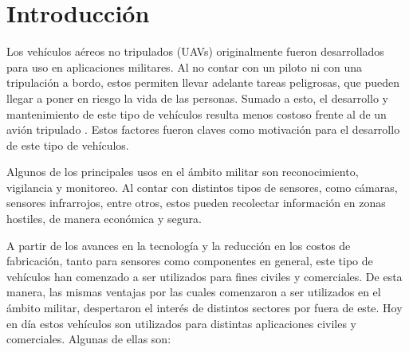 \section{Introducción}\label{sec:Introduccion}


Los vehículos aéreos no tripulados (UAVs) originalmente fueron desarrollados para uso en aplicaciones militares. Al no contar con un piloto ni con una tripulación a bordo, estos permiten llevar adelante tareas peligrosas, que pueden llegar a poner en riesgo la vida de las personas. Sumado a esto, el desarrollo y mantenimiento de este tipo de vehículos resulta menos costoso frente al de un avión tripulado \cite[p.~490]{collinson2023introduction}. Estos factores fueron claves como motivación para el desarrollo de este tipo de vehículos.

Algunos de los principales usos en el ámbito militar son reconocimiento, vigilancia y monitoreo. Al contar con distintos tipos de sensores, como cámaras, sensores infrarrojos, entre otros, estos pueden recolectar información en zonas hostiles, de manera económica y segura.

A partir de los avances en la tecnología y la reducción en los costos de fabricación, tanto para sensores como componentes en general, este tipo de vehículos han comenzado a ser utilizados para fines civiles y comerciales. De esta manera, las mismas ventajas por las cuales comenzaron a ser utilizados en el ámbito militar, despertaron el interés de distintos sectores por fuera de este. Hoy en día estos vehículos son utilizados para distintas aplicaciones civiles y comerciales. Algunas de ellas son:


